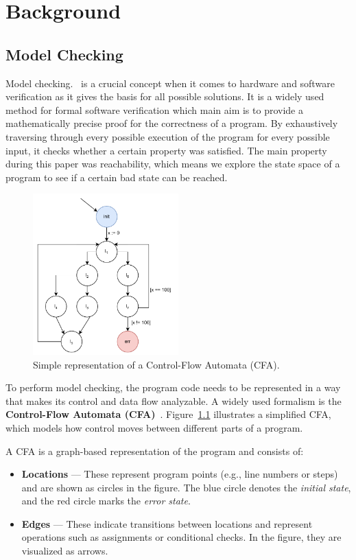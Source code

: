 \chapter{Background}

\section{Model Checking}
Model checking.~\cite{modelChecking} is a crucial concept when it comes to hardware and software verification as it gives the basis for all possible solutions. 
It is a widely used method for formal software verification which main aim is to provide a mathematically precise proof for the correctness of a program. By exhaustively traversing through every possible execution of the program for every possible input, it checks whether a certain property was satisfied. 
The main property during this paper was reachability, which means we explore the state space of a program to see if a certain bad state can be reached.

\begin{figure}
  \centering
  \includegraphics[width=0.5\textwidth]{figures/cfa_simple.pdf}
  \caption{Simple representation of a Control-Flow Automata (CFA).}
  \label{fig:cfa}
\end{figure}

To perform model checking, the program code needs to be represented in a way that makes its control and data flow analyzable. A widely used formalism is the \textbf{Control-Flow Automata (CFA)}~\cite{cfa}. Figure~\ref{fig:cfa} illustrates a simplified CFA, which models how control moves between different parts of a program.

A CFA is a graph-based representation of the program and consists of:
\begin{itemize}
  \item \textbf{Locations} — These represent program points (e.g., line numbers or steps) and are shown as circles in the figure. The blue circle denotes the \textit{initial state}, and the red circle marks the \textit{error state}.
  \item \textbf{Edges} — These indicate transitions between locations and represent operations such as assignments or conditional checks. In the figure, they are visualized as arrows.
\end{itemize}

